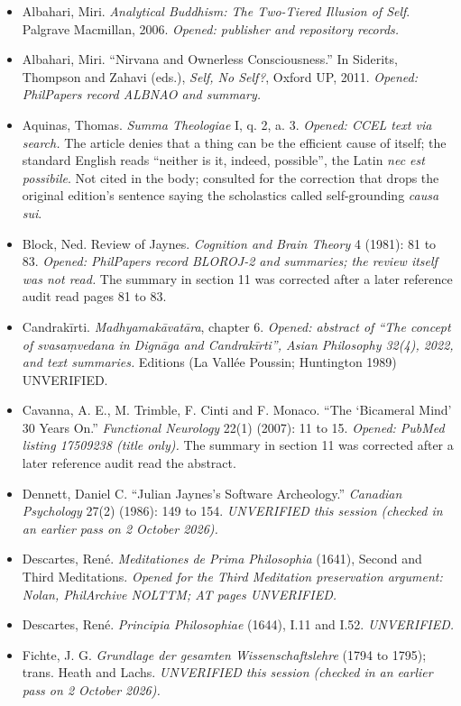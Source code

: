 \documentclass[11pt]{article}
\begin{document}
\begin{itemize}
\item Albahari, Miri. \emph{Analytical Buddhism: The Two-Tiered Illusion of Self}. Palgrave Macmillan, 2006. \emph{Opened: publisher and repository records.}
\item Albahari, Miri. ``Nirvana and Ownerless Consciousness.'' In Siderits, Thompson and Zahavi (eds.), \emph{Self, No Self?}, Oxford UP, 2011. \emph{Opened: PhilPapers record ALBNAO and summary.}
\item Aquinas, Thomas. \emph{Summa Theologiae} I, q. 2, a. 3. \emph{Opened: CCEL text via search.} The article denies that a thing can be the efficient cause of itself; the standard English reads ``neither is it, indeed, possible'', the Latin \emph{nec est possibile}. Not cited in the body; consulted for the correction that drops the original edition's sentence saying the scholastics called self-grounding \emph{causa sui}.
\item Block, Ned. Review of Jaynes. \emph{Cognition and Brain Theory} 4 (1981): 81 to 83. \emph{Opened: PhilPapers record BLOROJ-2 and summaries; the review itself was not read.} The summary in section 11 was corrected after a later reference audit read pages 81 to 83.
\item Candrakīrti. \emph{Madhyamakāvatāra}, chapter 6. \emph{Opened: abstract of ``The concept of svasaṃvedana in Dignāga and Candrakīrti'', Asian Philosophy 32(4), 2022, and text summaries.} Editions (La Vallée Poussin; Huntington 1989) UNVERIFIED.
\item Cavanna, A. E., M. Trimble, F. Cinti and F. Monaco. ``The `Bicameral Mind' 30 Years On.'' \emph{Functional Neurology} 22(1) (2007): 11 to 15. \emph{Opened: PubMed listing 17509238 (title only).} The summary in section 11 was corrected after a later reference audit read the abstract.
\item Dennett, Daniel C. ``Julian Jaynes's Software Archeology.'' \emph{Canadian Psychology} 27(2) (1986): 149 to 154. \emph{UNVERIFIED this session (checked in an earlier pass on 2 October 2026).}
\item Descartes, René. \emph{Meditationes de Prima Philosophia} (1641), Second and Third Meditations. \emph{Opened for the Third Meditation preservation argument: Nolan, PhilArchive NOLTTM; AT pages UNVERIFIED.}
\item Descartes, René. \emph{Principia Philosophiae} (1644), I.11 and I.52. \emph{UNVERIFIED.}
\item Fichte, J. G. \emph{Grundlage der gesamten Wissenschaftslehre} (1794 to 1795); trans. Heath and Lachs. \emph{UNVERIFIED this session (checked in an earlier pass on 2 October 2026).}

\end{itemize}
\end{document}

